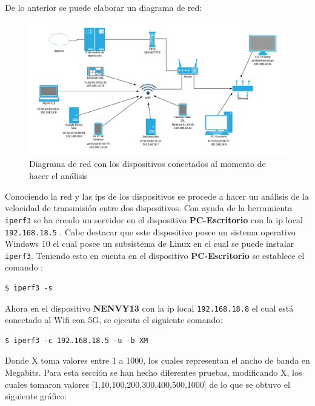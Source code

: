 \noindent De lo anterior se puede elaborar un diagrama de red: 

\begin{figure}[H]
	\centering
	\includegraphics[scale=0.57]{images/Diagrama de Red (1).png}
	\caption{Diagrama de red con los dispositivos conectados al momento de hacer el análisis }
	\label{diag:red}
\end{figure}


\noindent Conociendo la red y las ips de los dispositivos se procede a hacer un análisis de la velocidad de transmisión entre dos dispositivos. Con ayuda de la herramienta \verb|iperf3| se ha creado un servidor en el dispositivo \textbf{PC-Escritorio} con la ip local \verb|192.168.18.5| . Cabe destacar que este dispositivo posee un sistema operativo Windows 10 el cual posee un subsistema de Linux en el cual se puede instalar \verb|iperf3|. Teniendo esto en cuenta en el dispositivo \textbf{PC-Escritorio} se establece el comando :

\begin{lstlisting}
$ iperf3 -s
\end{lstlisting}

\noindent Ahora en el dispositivo \textbf{NENVY13} con la ip local \verb|192.168.18.8| el cual está conectado al Wifi con 5G, se ejecuta el siguiente comando:

\begin{lstlisting}
$ iperf3 -c 192.168.18.5 -u -b XM
\end{lstlisting}



\noindent Donde X toma valores entre 1 a 1000, los cuales representan el ancho de banda en Megabits. Para esta sección se han hecho diferentes pruebas, modificando X, los cuales tomaron valores [1,10,100,200,300,400,500,1000] de lo que se obtuvo el siguiente gráfico:

